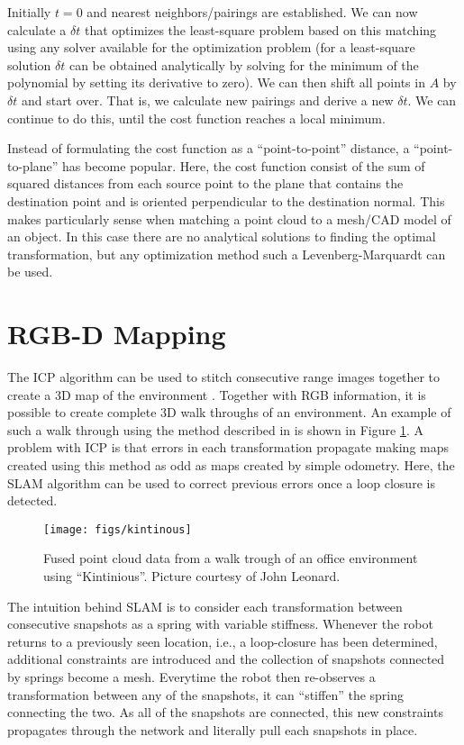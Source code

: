 \documentclass[paper=6.14in:9.21in,pagesize=pdftex,11pt,twoside,openright]{scrbook}
\begin{document}
Initially $t=0$ and nearest neighbors/pairings are established. We can now calculate a $ \delta t$ that optimizes the least-square problem based on this matching using any solver available for the optimization problem (for a least-square solution $ \delta t$ can be obtained analytically by solving for the minimum of the polynomial by setting its derivative to zero). We can then shift all points in $ A$ by $ \delta t$ and start over. That is, we calculate new pairings and derive a new $ \delta t$.  We can continue to do this, until the cost function reaches a local minimum.

Instead of formulating the cost function as a ``point-to-point'' distance, a ``point-to-plane'' has become popular. Here, the cost function consist of the sum of squared distances from each source point to the plane that contains the destination point and is oriented perpendicular to the destination normal. This makes particularly sense when matching a point cloud to a mesh/CAD model of an object. In this case there are no analytical solutions to finding the optimal transformation, but any optimization method such a Levenberg-Marquardt can be used.

\section{RGB-D Mapping}
The ICP algorithm can be used to stitch consecutive range images together to create a 3D map of the environment \cite{henry2010rgb}. Together with RGB information, it is possible to create complete 3D walk throughs of an environment. An example of such a walk through using the method described in \cite{whelan2013robust} is shown in Figure \ref{fig:kintinous}.
A problem with ICP is that errors in each transformation propagate making maps created using this method as odd as maps created by simple odometry. Here, the SLAM algorithm can be used to correct previous errors once a loop closure is detected.


\begin{figure}
\centering
\texttt{[image: figs/kintinous]}
\caption{Fused point cloud data from a walk trough of an office environment using ``Kintinious''. Picture courtesy of John Leonard.\label{fig:kintinous}}
\end{figure}

The intuition behind SLAM is to consider each transformation between consecutive snapshots as a spring with variable stiffness. Whenever the robot returns to a previously seen location, i.e., a loop-closure has been determined, additional constraints are introduced and the collection of snapshots connected by springs become a mesh. Everytime the robot then re-observes a transformation between any of the snapshots, it can ``stiffen'' the spring connecting the two. As all of the snapshots are connected, this new constraints propagates through the network and literally pull each snapshots in place.
\end{document}
